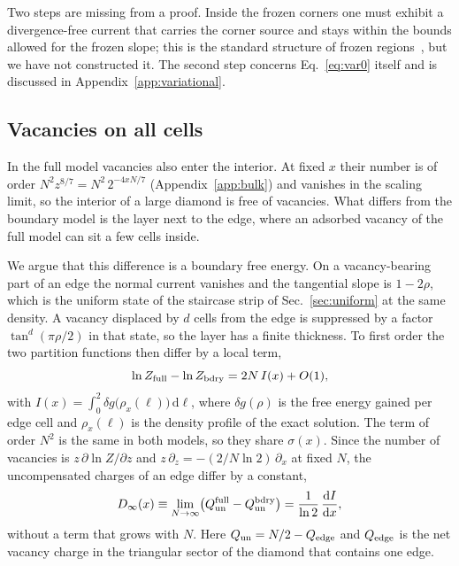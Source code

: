 \documentclass[reprint,aps,pre,superscriptaddress,longbibliography,floatfix,amsmath,amssymb]{revtex4-2}
\newcommand{\sig}{\sigma}                %
\newcommand{\Qun}{Q_{\rm un}}
\newcommand{\dd}{\mathrm{d}}
\begin{document}
Two steps are missing from a proof. Inside the frozen corners one must exhibit a divergence-free current that carries the corner source and stays within the bounds allowed for the frozen slope; this is the standard structure of frozen regions~\cite{kenyon2007}, but we have not constructed it. The second step concerns Eq.~\eqref{eq:var0} itself and is discussed in Appendix~\ref{app:variational}.

\subsection{Vacancies on all cells}

In the full model vacancies also enter the interior. At fixed $x$ their number is of order $N^2z^{8/7}=N^2\,2^{-4xN/7}$ (Appendix~\ref{app:bulk}) and vanishes in the scaling limit, so the interior of a large diamond is free of vacancies. What differs from the boundary model is the layer next to the edge, where an adsorbed vacancy of the full model can sit a few cells inside.

We argue that this difference is a boundary free energy. On a vacancy-bearing part of an edge the normal current vanishes and the tangential slope is $1-2\rho$, which is the uniform state of the staircase strip of Sec.~\ref{sec:uniform} at the same density. A vacancy displaced by $d$ cells from the edge is suppressed by a factor $\tan^d(\pi\rho/2)$ in that state, so the layer has a finite thickness. To first order the two partition functions then differ by a local term,
\begin{equation}\label{eq:dg}
  \ln Z_{\rm full}-\ln Z_{\rm bdry}=2N\,I(x)+O(1),
\end{equation}
with $I(x)=\int_0^2\delta g\bigl(\rho_x(\ell)\bigr)\,\dd\ell$, where $\delta g(\rho)$ is the free energy gained per edge cell and $\rho_x(\ell)$ is the density profile of the exact solution. The term of order $N^2$ is the same in both models, so they share $\sig(x)$. Since the number of vacancies is $z\,\partial\ln Z/\partial z$ and $z\,\partial_z=-(2/N\ln2)\,\partial_x$ at fixed $N$, the uncompensated charges of an edge differ by a constant,
\begin{equation}\label{eq:Dinf}
  D_\infty(x)\equiv\lim_{N\to\infty}\bigl(\Qun^{\rm full}-\Qun^{\rm bdry}\bigr)=\frac{1}{\ln2}\,\frac{\dd I}{\dd x},
\end{equation}
without a term that grows with $N$. Here $\Qun=N/2-Q_{\rm edge}$ and $Q_{\rm edge}$ is the net vacancy charge in the triangular sector of the diamond that contains one edge.
\end{document}
